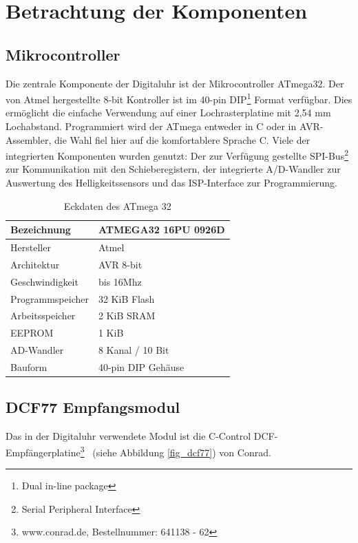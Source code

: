 \section{Betrachtung der Komponenten}
\subsection{Mikrocontroller}
Die zentrale Komponente der Digitaluhr ist der Mikrocontroller ATmega32. Der von Atmel hergestellte 8-bit Kontroller ist im 40-pin DIP\footnote{Dual in-line package} Format verfügbar. Dies ermöglicht die einfache Verwendung auf einer Lochrasterplatine mit 2,54 mm Lochabstand. Programmiert wird der ATmega entweder in C oder in AVR-Assembler, die Wahl fiel hier auf die komfortablere Sprache C.
Viele der integrierten Komponenten wurden genutzt: Der zur Verfügung gestellte SPI-Bus\footnote{Serial Peripheral Interface} zur Kommunikation mit den Schieberegistern, der integrierte A/D-Wandler zur Auswertung des Helligkeitssensors und das ISP-Interface zur Programmierung.
\begin{table}[htp]
  \centering
  \renewcommand{\arraystretch}{1.2}
  \begin{tabular}{||l | l||}
  \hline\hline
  Bezeichnung&ATMEGA32 16PU 0926D\\\hline
  Hersteller&Atmel\\\hline
  Architektur&AVR 8-bit \\\hline
  Geschwindigkeit&bis 16Mhz \\\hline
  Programmspeicher&32 KiB Flash \\\hline
  Arbeitsspeicher&2 KiB SRAM \\\hline
  EEPROM&1 KiB \\\hline
  AD-Wandler&8 Kanal / 10 Bit \\\hline
  Bauform&40-pin DIP Gehäuse \\
  \hline\hline    
\end{tabular}
\caption{Eckdaten des ATmega 32}
\end{table}

\subsection{DCF77 Empfangsmodul}\label{sec_dcf77modul}
Das in der Digitaluhr verwendete Modul ist die \glqq C-Control DCF-Empfängerplatine\grqq\footnote{www.conrad.de, Bestellnummer: 641138 - 62}~ (siehe Abbildung \ref{fig_dcf77}) von Conrad.

